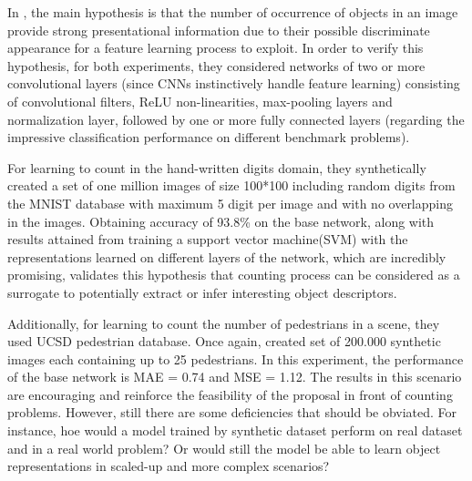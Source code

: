In \cite{segui2015learning}, the main hypothesis is that the number of occurrence of objects in an image provide strong presentational information due to their possible discriminate appearance for a feature learning process to exploit. In order to verify this hypothesis, for both experiments, they considered networks of two or more convolutional layers (since CNNs instinctively handle feature learning\cite{lecun1989backpropagation}) consisting of convolutional filters, ReLU non-linearities, max-pooling layers and normalization layer, followed by one or more fully connected layers (regarding the impressive classification performance on different benchmark problems\cite{krizhevsky2012imagenet, Karpathy_2014_CVPR, ciresan2011flexible})\cite{segui2015learning}. 

For learning to count in the hand-written digits domain, they synthetically created a set of one million images of size 100*100 including random digits from the MNIST database with maximum 5 digit per image and with no overlapping in the images. Obtaining accuracy of 93.8\% on the base network, along with results attained from training a support vector machine(SVM) with the representations learned on different layers of the network, which are incredibly promising, validates this hypothesis that counting process can be considered as a surrogate to potentially extract or infer interesting object descriptors\cite{segui2015learning}. 

Additionally, for learning to count the number of pedestrians in a scene, they used UCSD pedestrian database\cite{chan2008privacy}. Once again, \citealt*{segui2015learning} created set of 200.000 synthetic images each containing up to 25 pedestrians. In this experiment, the performance of the base network is MAE = 0.74 and MSE  = 1.12. The results in this scenario are encouraging and reinforce the feasibility of the proposal in front of counting problems. However, still there are some deficiencies that should be obviated. For instance, hoe would a model trained by synthetic dataset perform on real dataset and in a real world problem? Or would still the model be able to learn object representations in scaled-up and more complex scenarios?






